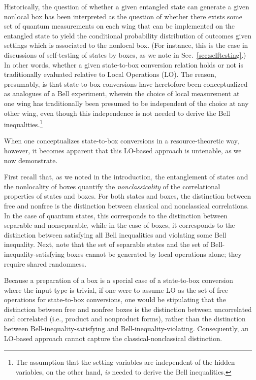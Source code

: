 \documentclass[12pt]{article}
\theoremstyle{plain}
\theoremstyle{definition}
\begin{document}
 
Historically, the question of whether a given entangled state can generate a given nonlocal box has 
been interpreted as the question of whether there exists some set of quantum measurements on each wing that can be implemented on the entangled state to yield the conditional probability distribution of outcomes given settings which is associated to the nonlocal box.  (For instance, this is the case in discussions of self-testing of states by boxes, as we note in Sec.~\ref{sec:selftesting}.)  In other words, whether a given state-to-box conversion relation holds or not is traditionally evaluated relative to Local Operations (LO).
  The reason, presumably, is that state-to-box conversions have heretofore been conceptualized as analogues of a Bell experiment, wherein the choice of local measurement at one wing has traditionally been presumed to be independent of the choice at any other wing, even though this independence is not needed to derive the Bell inequalities.\footnote{The assumption that the setting variables are independent of the hidden variables, on the other hand, {\em is} needed to derive the Bell inequalities.}   
   
When one conceptualizes state-to-box conversions in a resource-theoretic way, however, it becomes apparent that this LO-based approach is untenable, as we now demonstrate.

  
First recall that, as we noted in the introduction, the entanglement of states and the nonlocality of boxes quantify the {\em nonclassicality} of the correlational properties of states and boxes.  For both states and boxes, the distinction between free and nonfree  is the distinction between classical and nonclassical correlations.  In the case of quantum states, this corresponds to the distinction between separable and nonseparable, while in the case of boxes, it corresponds to the distinction between satisfying all Bell inequalities and violating some Bell inequality.  
Next, note that the set of separable states and the set of Bell-inequality-satisfying boxes cannot be generated by local operations alone; they require shared randomness. 



Because a preparation of a box is a special case of 
a state-to-box conversion 
where the input type is trivial, if one were to assume LO as the set of free operations for state-to-box 
conversions, one would be stipulating that the distinction between free and nonfree boxes is the distinction between uncorrelated and correlated (i.e., product and nonproduct forms), rather than the distinction between Bell-inequality-satisfying and Bell-inequality-violating.  Consequently, an LO-based approach cannot capture the classical-nonclassical distinction. 
\end{document}
